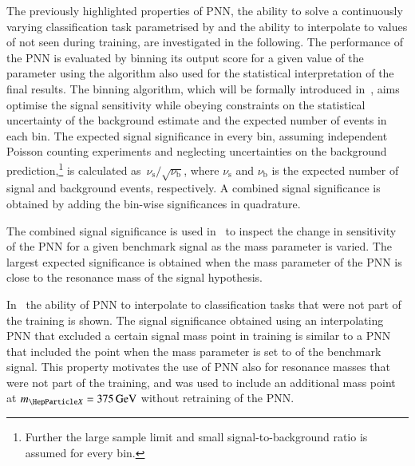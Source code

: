 The previously highlighted properties of PNN, the ability to solve a
continuously varying classification task parametrised by \mX and the
ability to interpolate to values of \mX not seen during training, are
investigated in the following. The performance of the PNN is evaluated
by binning its output score for a given value of the parameter using
the algorithm also used for the statistical interpretation of the
final results. The binning algorithm, which will be formally
introduced in~, aims optimise the signal
sensitivity while obeying constraints on the statistical uncertainty
of the background estimate and the expected number of events in each
bin. The expected signal significance in every bin, assuming
independent Poisson counting experiments and neglecting uncertainties
on the background prediction,\footnote{Further the large sample limit
  and small signal-to-background ratio is assumed for every bin.} is
calculated as~$\nu_\text{s} / \sqrt{\nu_\text{b}}$, where
$\nu_\text{s}$ and $\nu_\text{b}$ is the expected number of signal and
background events, respectively. A combined signal significance is
obtained by adding the bin-wise significances in quadrature.

The combined signal significance is used in~ to
inspect the change in sensitivity of the PNN for a given benchmark
signal as the mass parameter is varied. The largest expected
significance is obtained when the mass parameter of the PNN is close
to the resonance mass of the signal hypothesis.

In~ the ability of PNN to interpolate to
classification tasks that were not part of the training is shown. The
signal significance obtained using an interpolating PNN that excluded
a certain signal mass point in training is similar to a PNN that
included the point when the mass parameter is set to \mX of the
benchmark signal. This property motivates the use of PNN also for
resonance masses that were not part of the training, and was used to
include an additional mass point at $\mX = \SI{375}{\GeV}$ without
retraining of the PNN. %

